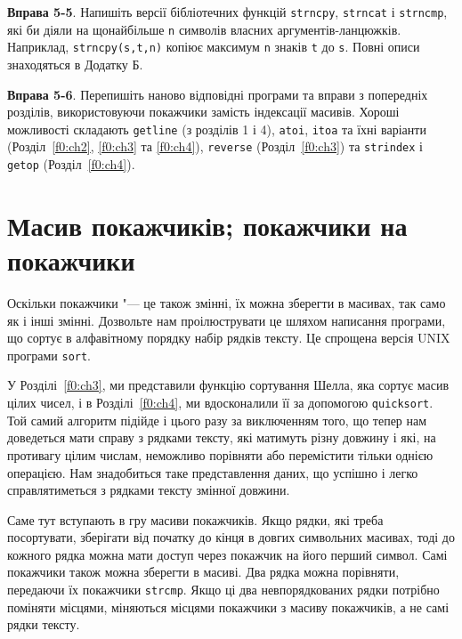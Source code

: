\documentclass[a4paper,12pt]{book}
\begin{document}
  \textbf{Вправа 5-5}. Напишіть версії бібліотечних функцій \texttt{strncpy},
  \texttt{strncat} і \texttt{strncmp}, які би діяли на щонайбільше \texttt{n} символів
  власних аргументів-ланцюжків. Наприклад, \texttt{strncpy(s,t,n)} копіює максимум
  \texttt{n} знаків \texttt{t} до \texttt{s}. Повні описи знаходяться в Додатку Б.

  \textbf{Вправа 5-6}. Перепишіть наново відповідні програми та вправи з попередніх
  розділів, використовуючи покажчики замість індексації масивів. Хороші можливості
  складають \texttt{getline} (з розділів 1 і 4), \texttt{atoi}, \texttt{itoa} та їхні
  варіанти (Розділ~\ref{f0:ch2}, \ref{f0:ch3} та \ref{f0:ch4}), \texttt{reverse} 
  (Розділ~\ref{f0:ch3}) та \texttt{strindex} і \texttt{getop} (Розділ~\ref{f0:ch4}).

\section{Масив покажчиків; покажчики на покажчики}

\label{f0:ch5.6}
  Оскільки покажчики "--- це також змінні, їх можна зберегти в масивах, так само як і
  інші змінні. Дозвольте нам проілюструвати це шляхом написання програми, що сортує в
  алфавітному порядку набір рядків тексту. Це спрощена версія UNIX програми
  \texttt{sort}.

  У Розділі~\ref{f0:ch3}, ми представили функцію сортування Шелла, яка сортує
  масив цілих чисел, і в Розділі~\ref{f0:ch4}, ми вдосконалили її за допомогою
  \texttt{quicksort}. Той самий алгоритм підійде і цього разу за виключенням того, що
  тепер нам доведеться мати справу з рядками тексту, які матимуть різну довжину і які,
  на противагу цілим числам, неможливо порівняти або перемістити тільки однією операцією.
  Нам знадобиться таке представлення даних, що успішно і легко справлятиметься з рядками
  тексту змінної довжини.

  Саме тут вступають в гру масиви покажчиків. Якщо рядки, які треба посортувати, зберігати
  від початку до кінця в довгих символьних масивах, тоді до кожного рядка можна мати
  доступ через покажчик на його перший символ. Самі покажчики також можна зберегти в
  масиві. Два рядка можна порівняти, передаючи їх покажчики \texttt{strcmp}. Якщо ці два
  невпорядкованих рядки потрібно поміняти місцями, міняються місцями покажчики з масиву
  покажчиків, а не самі рядки тексту.

\end{document}
